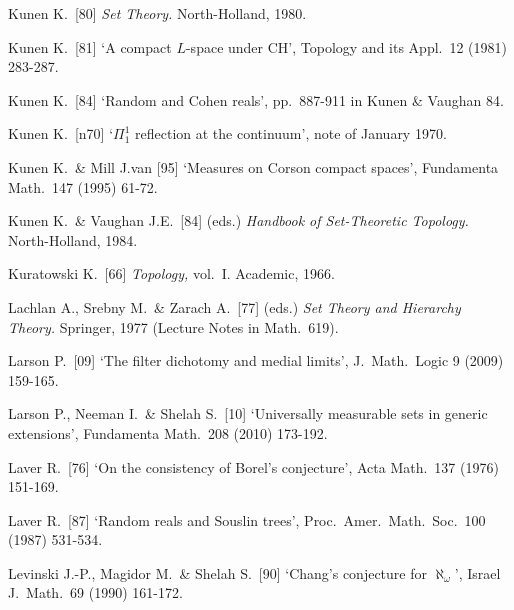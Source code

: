 {Kunen K.\ [80] {\it Set Theory.}  North-Holland, 1980.

Kunen K.\ [81] `A compact $L$-space under CH', Topology and its Appl.\
12 (1981) 283-287.
\cmmnt{[\S531 {\it notes\/}.]}

Kunen K.\ [84] `Random and Cohen reals', pp.\ 887-911 in
{\smc Kunen \& Vaughan 84}.
\cmmnt{[\S554 {\it notes}.]}

Kunen K.\ [n70] `$\Pi^1_1$ reflection at the continuum', note of January
1970.
\cmmnt{[543C, 544C, 544E, 544F.]}

Kunen K.\ \& Mill J.van [95] `Measures on Corson compact spaces',
Fundamenta Math.\ 147 (1995) 61-72.
\cmmnt{[531P.]}

Kunen K.\ \& Vaughan J.E.\ [84] (eds.) {\it Handbook of Set-Theoretic
Topology.}   North-Holland, 1984.

Kuratowski K.\ [66] {\it Topology,} vol.\ I.   Academic, 1966.
\cmmnt{[562G.]}

\medskip%

Lachlan A., Srebny M.\ \& Zarach A.\ [77] (eds.) {\it Set Theory and Hierarchy Theory.}  Springer, 1977 (Lecture Notes in Math.\ 619).


Larson P.\ [09] `The filter dichotomy and medial limits',
J.\ Math.\ Logic 9 (2009) 159-165.
\cmmnt{[538S.]}

Larson P., Neeman I.\ \& Shelah S.\ [10] `Universally measurable sets in
generic extensions', Fundamenta Math.\ 208 (2010) 173-192.
\cmmnt{[553O.]}
	

Laver R.\ [76] `On the consistency of Borel's conjecture', Acta Math.\
137 (1976) 151-169.
\cmmnt{[534O.]}

Laver R.\ [87] `Random reals and Souslin trees',
Proc.\ Amer.\ Math.\ Soc.\ 100 (1987) 531-534.
\cmmnt{[553M.]}

Levinski J.-P., Magidor M.\ \& Shelah S.\ [90] `Chang's conjecture for
$\aleph_{\omega}$', Israel J.\ Math.\ 69 (1990) 161-172.
\cmmnt{[5A6F.]}

}
